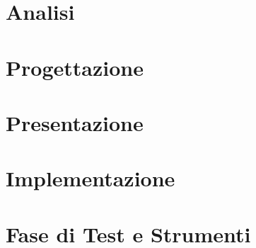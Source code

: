 \documentclass[a4paper, dvipsnames, table]{article}
\begin{document}
\copertina

\newpage
\tableofcontents

\newpage


\newpage
\section{Analisi}



\newpage
\section{Progettazione}




\newpage
\section{Presentazione}




\newpage
\section{Implementazione}





\newpage


\newpage
\section{Fase di Test e Strumenti}




\newpage

\end{document}
